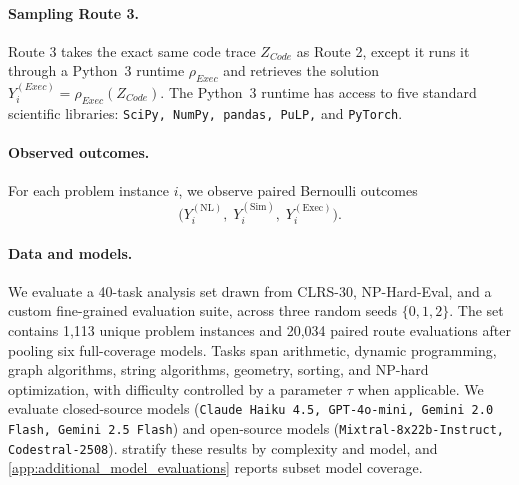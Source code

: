 \paragraph{Sampling Route 3.} Route 3 takes the exact same code trace $Z_{Code}$ as Route 2, except it runs it through a Python~3 runtime $\rho_{Exec}$ and retrieves the solution $Y_i^{(Exec)} = \rho_{Exec}(Z_{Code})$. The Python~3 runtime has access to five standard scientific libraries: \texttt{SciPy, NumPy, pandas, PuLP,} and \texttt{PyTorch}.
\paragraph{Observed outcomes.}
For each problem instance $i$, we observe paired Bernoulli outcomes \[\bigl(Y_i^{(\mathrm{NL})},\; Y_i^{(\mathrm{Sim})},\; Y_i^{(\mathrm{Exec})}\bigr).\]
\paragraph{Data and models.}
We evaluate a 40-task analysis set drawn from CLRS-30, NP-Hard-Eval,
and a custom fine-grained evaluation suite, across three random seeds
$\{0,1,2 \}$. The set contains 1,113 unique problem instances and
20,034 paired route evaluations after pooling six full-coverage models.
Tasks span arithmetic, dynamic programming, graph algorithms, string
algorithms, geometry, sorting, and NP-hard optimization, with difficulty
controlled by a parameter $\tau$ when applicable.
We evaluate closed-source models (\texttt{Claude Haiku~4.5, GPT-4o-mini,
Gemini~2.0 Flash, Gemini~2.5 Flash}) and open-source models
(\texttt{Mixtral-8x22b-Instruct, Codestral-2508}).
stratify these results by complexity and model, and
\cref{app:additional_model_evaluations} reports subset model coverage.


